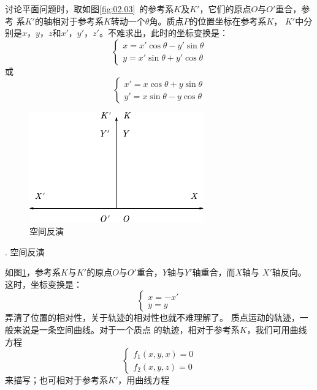 讨论平面问题时，取如图\ref{fig:02.03}~的参考系$K$及$K'$，它们的原点$O$与$O'$重合，参考
系$K'$的轴相对于参考系$ K $转动一个$\theta$角。质点$P$的位置坐标在参考系$K$，
$K'$中分别是$x$，$y$，$z$和$x'$，$y'$，$z'$。不难求出，此时的坐标变换是：\vspace{-0.2em}
\begin{equation}\label{eqn:02.02.04}
    \left\{\begin{array}{l}
        x=x'\cos\theta-y'\sin\theta \\
        y=x'\sin\theta+y'\cos\theta
    \end{array}\right.
\end{equation}
或\vspace{-1em}
\begin{equation*}
    \left\{\begin{array}{l}
        x'=x\cos\theta+y\sin\theta \\
        y'=x\sin\theta-y\cos\theta
    \end{array}\right.
\end{equation*}

\begin{figure}
    \centering
    \includegraphics{figure/fig02.04}
    \caption{空间反演}
    \label{fig:02.04}
\end{figure}
. 空间反演 \normalfont

如图\ref{fig:02.04}，参考系$K$与$K'$的原点$O$与$O'$重合，$Y$轴与$Y'$轴重合，而$X$轴与
$X'$轴反向。这时，坐标变换是：\vspace{-0.5em}
{\setlength{\mathindent}{2em}
\begin{equation}\label{eqn:02.02.05}
    \left\{\begin{array}{l}
        x=-x' \\
        y=y
    \end{array}\right.
\end{equation}}%
弄清了位置的相对性，关于轨迹的相对性也就不难理解了。
质点运动的轨迹，一般来说是一条空间曲线。对于一个质点
的轨迹，相对于参考系$ K $，我们可用曲线方程
\begin{equation}\label{eqn:02.02.06}
    \left\{\begin{array}{l}
        f_1(x,y,x)=0 \\
        f_2(x,y,z)=0
    \end{array}\right.
\end{equation}
来描写；也可相对于参考系$K'$，用曲线方程

